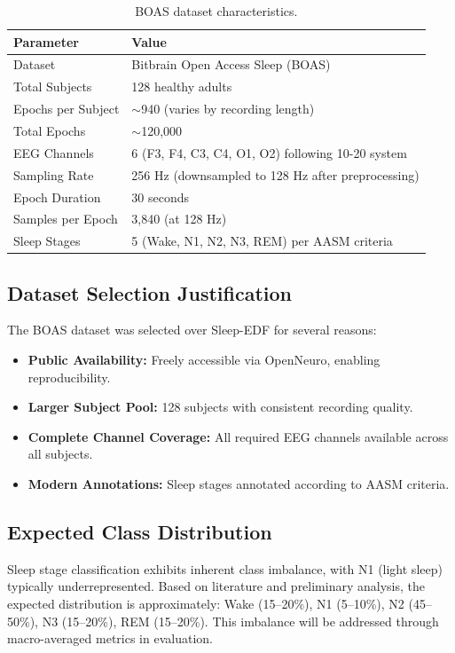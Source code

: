 \documentclass{imc-inf} %
\begin{document}
\begin{table}[ht]
\centering
\begin{tabular}{|l|l|}
\hline
\textbf{Parameter} & \textbf{Value} \\
\hline
Dataset & Bitbrain Open Access Sleep (BOAS) \\
Total Subjects & 128 healthy adults \\
Epochs per Subject & $\sim$940 (varies by recording length) \\
Total Epochs & $\sim$120,000 \\
EEG Channels & 6 (F3, F4, C3, C4, O1, O2) following 10-20 system \\
Sampling Rate & 256 Hz (downsampled to 128 Hz after preprocessing) \\
Epoch Duration & 30 seconds \\
Samples per Epoch & 3,840 (at 128 Hz) \\
Sleep Stages & 5 (Wake, N1, N2, N3, REM) per AASM criteria \\
\hline
\end{tabular}
\caption{BOAS dataset characteristics.}
\label{tab:dataset_overview}
\end{table}

\subsection{Dataset Selection Justification}

The BOAS dataset was selected over Sleep-EDF for several reasons:
\begin{itemize}
\item \textbf{Public Availability:} Freely accessible via OpenNeuro, enabling reproducibility.
\item \textbf{Larger Subject Pool:} 128 subjects with consistent recording quality.
\item \textbf{Complete Channel Coverage:} All required EEG channels available across all subjects.
\item \textbf{Modern Annotations:} Sleep stages annotated according to AASM criteria.
\end{itemize}

\subsection{Expected Class Distribution}

Sleep stage classification exhibits inherent class imbalance, with N1 (light sleep) typically underrepresented. Based on literature and preliminary analysis, the expected distribution is approximately: Wake (15--20\%), N1 (5--10\%), N2 (45--50\%), N3 (15--20\%), REM (15--20\%). This imbalance will be addressed through macro-averaged metrics in evaluation.
\end{document}

